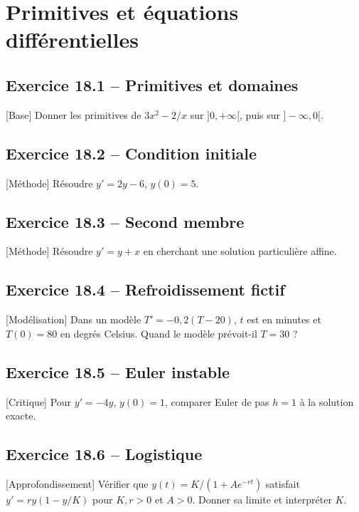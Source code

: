 \chapter{Primitives et équations différentielles}
\section*{Exercice 18.1 -- Primitives et domaines}
[Base] Donner les primitives de $3x^2-2/x$ sur $]0,+\infty[$, puis sur $]-\infty,0[$.

\section*{Exercice 18.2 -- Condition initiale}
[Méthode] Résoudre $y'=2y-6$, $y(0)=5$.

\section*{Exercice 18.3 -- Second membre}
[Méthode] Résoudre $y'=y+x$ en cherchant une solution particulière affine.

\section*{Exercice 18.4 -- Refroidissement fictif}
[Modélisation] Dans un modèle $T'=-0{,}2(T-20)$, $t$ est en minutes et $T(0)=80$ en degrés Celsius. Quand le modèle prévoit-il $T=30$ ?

\section*{Exercice 18.5 -- Euler instable}
[Critique] Pour $y'=-4y$, $y(0)=1$, comparer Euler de pas $h=1$ à la solution exacte.

\section*{Exercice 18.6 -- Logistique}
[Approfondissement] Vérifier que $y(t)=K/(1+Ae^{-rt})$ satisfait $y'=ry(1-y/K)$ pour $K,r>0$ et $A>0$. Donner sa limite et interpréter $K$.
